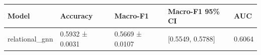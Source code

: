 \begin{tabular}{lllll}
\toprule
Model & Accuracy & Macro-F1 & Macro-F1 95\% CI & AUC \\
\midrule
relational\_gnn & 0.5932 ± 0.0031 & 0.5669 ± 0.0107 & [0.5549, 0.5788] & 0.6064 \\
\bottomrule
\end{tabular}
